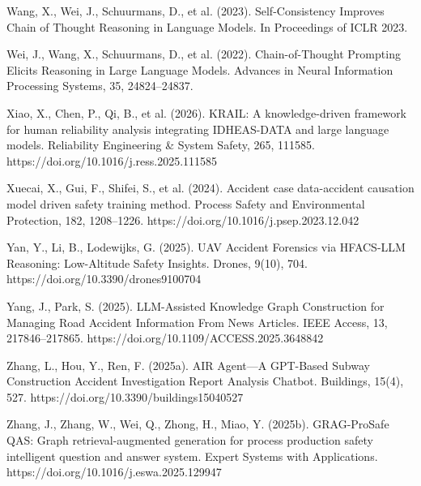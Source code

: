 \documentclass[11pt]{article}
\begin{document}
Wang, X., Wei, J., Schuurmans, D., et al. (2023). Self-Consistency Improves Chain of Thought Reasoning in Language Models. In Proceedings of ICLR 2023.

Wei, J., Wang, X., Schuurmans, D., et al. (2022). Chain-of-Thought Prompting Elicits Reasoning in Large Language Models. Advances in Neural Information Processing Systems, 35, 24824--24837.

Xiao, X., Chen, P., Qi, B., et al. (2026). KRAIL: A knowledge-driven framework for human reliability analysis integrating IDHEAS-DATA and large language models. Reliability Engineering \& System Safety, 265, 111585. https:/\allowbreak{}/\allowbreak{}doi.\allowbreak{}org/\allowbreak{}10.\allowbreak{}1016/\allowbreak{}j.\allowbreak{}ress.\allowbreak{}2025.\allowbreak{}111585

Xuecai, X., Gui, F., Shifei, S., et al. (2024). Accident case data-accident causation model driven safety training method. Process Safety and Environmental Protection, 182, 1208--1226. https:/\allowbreak{}/\allowbreak{}doi.\allowbreak{}org/\allowbreak{}10.\allowbreak{}1016/\allowbreak{}j.\allowbreak{}psep.\allowbreak{}2023.\allowbreak{}12.\allowbreak{}042

Yan, Y., Li, B., Lodewijks, G. (2025). UAV Accident Forensics via HFACS-LLM Reasoning: Low-Altitude Safety Insights. Drones, 9(10), 704. https:/\allowbreak{}/\allowbreak{}doi.\allowbreak{}org/\allowbreak{}10.\allowbreak{}3390/\allowbreak{}drones9100704

Yang, J., Park, S. (2025). LLM-Assisted Knowledge Graph Construction for Managing Road Accident Information From News Articles. IEEE Access, 13, 217846--217865. https:/\allowbreak{}/\allowbreak{}doi.\allowbreak{}org/\allowbreak{}10.\allowbreak{}1109/\allowbreak{}ACCESS.\allowbreak{}2025.\allowbreak{}3648842

Zhang, L., Hou, Y., Ren, F. (2025a). AIR Agent---A GPT-Based Subway Construction Accident Investigation Report Analysis Chatbot. Buildings, 15(4), 527. https:/\allowbreak{}/\allowbreak{}doi.\allowbreak{}org/\allowbreak{}10.\allowbreak{}3390/\allowbreak{}buildings15040527

Zhang, J., Zhang, W., Wei, Q., Zhong, H., Miao, Y. (2025b). GRAG-ProSafe QAS: Graph retrieval-augmented generation for process production safety intelligent question and answer system. Expert Systems with Applications. https:/\allowbreak{}/\allowbreak{}doi.\allowbreak{}org/\allowbreak{}10.\allowbreak{}1016/\allowbreak{}j.\allowbreak{}eswa.\allowbreak{}2025.\allowbreak{}129947
\end{document}
